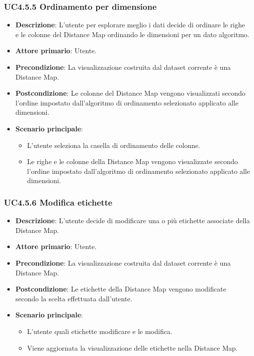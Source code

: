 \subsubsection{UC4.5.5 Ordinamento per dimensione}
\label{ssub:uc4.5.5}
\begin{itemize}
    \item \textbf{Descrizione}: L'utente per esplorare meglio i dati decide di ordinare le righe e le colonne del Distance Map ordinando le dimensioni per un dato algoritmo.
    \item \textbf{Attore primario}: Utente.
    \item \textbf{Precondizione}: La visualizzazione costruita dal dataset corrente è una Distance Map.
    \item \textbf{Postcondizione}: Le colonne del Distance Map vengono visualizzati secondo l'ordine impostato dall'algoritmo di ordinamento selezionato applicato alle dimensioni.
    \item \textbf{Scenario principale}: 
    \begin{itemize}
        \item L'utente seleziona la casella di ordinamento delle colonne.
        \item Le righe e le colonne della Distance Map vengono visualizzate secondo l'ordine impostato dall'algoritmo di ordinamento selezionato applicato alle dimensioni.
    \end{itemize}
\end{itemize}


\subsubsection{UC4.5.6 Modifica etichette}
\label{ssub:uc4.5.6}
\begin{itemize}
    \item \textbf{Descrizione}: L'utente decide di modificare una o più etichette associate della Distance Map.
    \item \textbf{Attore primario}: Utente.
    \item \textbf{Precondizione}: La visualizzazione costruita dal dataset corrente è una Distance Map.
    \item \textbf{Postcondizione}: Le etichette della Distance Map vengono modificate secondo la scelta effettuata dall'utente.
    \item \textbf{Scenario principale}:
    \begin{itemize}
        \item L'utente quali etichette modificare e le modifica.
        \item Viene aggiornata la visualizzazione delle etichette nella Distance Map.
    \end{itemize}
\end{itemize}



